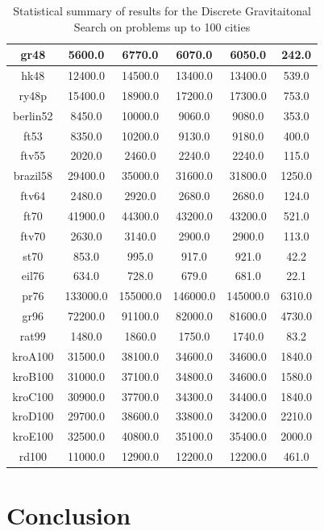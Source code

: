 \documentclass{article}
\begin{document}
\begin{table}[h!]
{\begin{tabular}{|c||c|c|c|c|c|}
            \hline
            gr48 & 5600.0 & 6770.0 & 6070.0 & 6050.0 & 242.0 \\
            \hline
            hk48 & 12400.0 & 14500.0 & 13400.0 & 13400.0 & 539.0 \\
            \hline
            ry48p & 15400.0 & 18900.0 & 17200.0 & 17300.0 & 753.0 \\
            \hline
            berlin52 & 8450.0 & 10000.0 & 9060.0 & 9080.0 & 353.0 \\
            \hline
            ft53 & 8350.0 & 10200.0 & 9130.0 & 9180.0 & 400.0 \\
            \hline
            ftv55 & 2020.0 & 2460.0 & 2240.0 & 2240.0 & 115.0 \\
            \hline
            brazil58 & 29400.0 & 35000.0 & 31600.0 & 31800.0 & 1250.0 \\
            \hline
            ftv64 & 2480.0 & 2920.0 & 2680.0 & 2680.0 & 124.0 \\
            \hline
            ft70 & 41900.0 & 44300.0 & 43200.0 & 43200.0 & 521.0 \\
            \hline
            ftv70 & 2630.0 & 3140.0 & 2900.0 & 2900.0 & 113.0 \\
            \hline
            st70 & 853.0 & 995.0 & 917.0 & 921.0 & 42.2 \\
            \hline
            eil76 & 634.0 & 728.0 & 679.0 & 681.0 & 22.1 \\
            \hline
            pr76 & 133000.0 & 155000.0 & 146000.0 & 145000.0 & 6310.0 \\
            \hline
            gr96 & 72200.0 & 91100.0 & 82000.0 & 81600.0 & 4730.0 \\
            \hline
            rat99 & 1480.0 & 1860.0 & 1750.0 & 1740.0 & 83.2 \\
            \hline
            kroA100 & 31500.0 & 38100.0 & 34600.0 & 34600.0 & 1840.0 \\
            \hline
            kroB100 & 31000.0 & 37100.0 & 34800.0 & 34600.0 & 1580.0 \\
            \hline
            kroC100 & 30900.0 & 37700.0 & 34300.0 & 34400.0 & 1840.0 \\
            \hline
            kroD100 & 29700.0 & 38600.0 & 33800.0 & 34200.0 & 2210.0 \\
            \hline
            kroE100 & 32500.0 & 40800.0 & 35100.0 & 35400.0 & 2000.0 \\
            \hline
            rd100 & 11000.0 & 12900.0 & 12200.0 & 12200.0 & 461.0 \\
            \hline
        \end{tabular}
        }
        \caption{Statistical summary of results for the Discrete Gravitaitonal Search on problems up to 100 cities}
    \end{table}
\section{Conclusion}

\pagebreak
\nocite*{}

\end{document}

